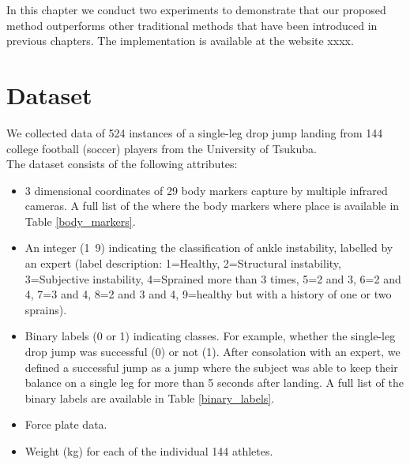 In this chapter we conduct two experiments to demonstrate that our proposed method outperforms other traditional methods that have been introduced in previous chapters. The implementation is available at the website xxxx.

\section{Dataset}

We collected data of 524 instances of a single-leg drop jump landing from 144 college football (soccer) players from the University of Tsukuba.
\\

The dataset consists of the following attributes:
\begin{itemize}
	\item 3 dimensional coordinates of 29 body markers capture by multiple infrared cameras. A full list of the where the body markers where place is available in Table \ref{body_markers}.
	\item An integer (1~9) indicating the classification of ankle instability, labelled by an expert (label description: 1=Healthy, 2=Structural instability, 3=Subjective instability, 4=Sprained more than 3 times, 5=2 and 3, 6=2 and 4, 7=3 and 4, 8=2 and 3 and 4, 9=healthy but with a history of one or two sprains).
	\item Binary labels (0 or 1) indicating classes. For example, whether the single-leg drop jump was successful (0) or not (1). After consolation with an expert, we defined a successful jump as a jump where the subject was able to keep their balance on a single leg for more than 5 seconds after landing. A full list of the binary labels are available in Table \ref{binary_labels}.
	\item Force plate data.
	\item Weight (kg) for each of the individual 144 athletes.
\end{itemize}

